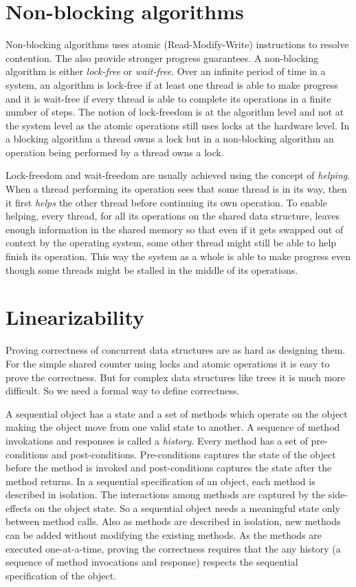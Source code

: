 \section{Non-blocking algorithms}
Non-blocking algorithms uses atomic (Read-Modify-Write) instructions to resolve contention. The also provide stronger progress guarantees. A non-blocking algorithm is either \emph{lock-free} or \emph{wait-free}. Over an infinite period of time in a system, an algorithm is lock-free if at least one thread is able to make progress and it is wait-free if every thread is able to complete its operations in a finite number of steps. The notion of lock-freedom is at the algorithm level and not at the system level as the atomic operations still uses locks at the hardware level. In a blocking algorithm a thread owns a lock but in a non-blocking algorithm an operation being performed by a thread owns a lock.

Lock-freedom and wait-freedom are usually achieved using the concept of \emph{helping}. When a thread performing its operation sees that some thread is in its way,  then it first \emph{helps} the other thread before continuing its own operation. To enable helping, every thread, for all its operations on the shared data structure, leaves enough information in the shared memory so that even if it gets swapped out of context by the operating system, some other thread might still be able to help finish its operation. This way the system as a whole is able to make progress even though some threads might be stalled in the middle of its operations.

\section{Linearizability}
Proving correctness of concurrent data structures are as hard as designing them. For the simple shared counter using locks and atomic operations it is easy to prove the correctness. But for complex data structures like trees it is much more difficult. So we need a formal way to define correctness. 

A sequential object has a state and a set of methods which operate on the object making the object move from one valid state to another. A sequence of method invokations and responses is called a \emph{history}. Every method has a set of pre-conditions and post-conditions. Pre-conditions captures the state of the object before the method is invoked and post-conditions captures the state after the method returns. In a sequential specification of an object, each method is described in isolation. The interactions among methods are captured by the side-effects on the object state. So a sequential object needs a meaningful state only between method calls. Also as methods are described in isolation, new methods can be added without modifying the existing methods. As the methods are executed one-at-a-time, proving the correctness requires that the any history (a sequence of method invocations and response) respects the sequential specification of the object.

